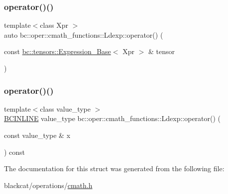 \mbox{\label{structbc_1_1oper_1_1cmath__functions_1_1Ldexp_adea82cf404b98ecbb06187f9a4841cea}} 
\subsubsection{\texorpdfstring{operator()()}{operator()()}\hspace{0.1cm}{\footnotesize\ttfamily [2/3]}}
{\footnotesize\ttfamily template$<$class Xpr $>$ \\
auto bc\+::oper\+::cmath\+\_\+functions\+::\+Ldexp\+::operator() (\begin{DoxyParamCaption}\item[{const \hyperlink{classbc_1_1tensors_1_1Expression__Base}{bc\+::tensors\+::\+Expression\+\_\+\+Base}$<$ Xpr $>$ \&}]{tensor }\end{DoxyParamCaption})\hspace{0.3cm}{\ttfamily [inline]}}

\mbox{\label{structbc_1_1oper_1_1cmath__functions_1_1Ldexp_a1374620cbb92096e6751657f5899ea8c}} 
\subsubsection{\texorpdfstring{operator()()}{operator()()}\hspace{0.1cm}{\footnotesize\ttfamily [3/3]}}
{\footnotesize\ttfamily template$<$class value\+\_\+type $>$ \\
\hyperlink{common_8h_a6699e8b0449da5c0fafb878e59c1d4b1}{B\+C\+I\+N\+L\+I\+NE} value\+\_\+type bc\+::oper\+::cmath\+\_\+functions\+::\+Ldexp\+::operator() (\begin{DoxyParamCaption}\item[{const value\+\_\+type \&}]{x }\end{DoxyParamCaption}) const\hspace{0.3cm}{\ttfamily [inline]}}



The documentation for this struct was generated from the following file\+:\begin{DoxyCompactItemize}
\item 
blackcat/operations/\hyperlink{cmath_8h}{cmath.\+h}\end{DoxyCompactItemize}
